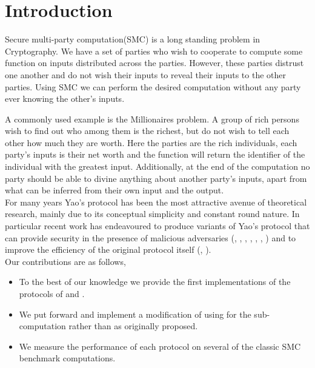 \documentclass[a4paper,11pt]{article}
\begin{document}
	
	\section{Introduction}
		Secure multi-party computation(SMC) is a long standing problem in Cryptography. We have a set of parties who wish to cooperate to compute some function on inputs distributed across the parties. However, these parties distrust one another and do not wish their inputs to reveal their inputs to the other parties. Using SMC we can perform the desired computation without any party ever knowing the other's inputs.

		A commonly used example is the Millionaires problem. A group of rich persons wish to find out who among them is the richest, but do not wish to tell each other how much they are worth. Here the parties are the rich individuals, each party's inputs is their net worth and the function will return the identifier of the individual with the greatest input. Additionally, at the end of the computation no party should be able to divine anything about another party's inputs, apart from what can be inferred from their own input and the output.\\

		For many years Yao's protocol \cite{YaoOriginal} has been the most attractive avenue of theoretical research, mainly due to its conceptual simplicity and constant round nature. In particular recent work has endeavoured to produce variants of Yao's protocol that can provide security in the presence of malicious adversaries (\cite{LindellAndPinkas2007}, \cite{LindellAndPinkas2011}, \cite{Lindell_CnC_2013}, \cite{Katz_Symm_CnC_2013}, \cite{OnCommittedInputs}, \cite{LEGO_Paper}, \cite{MiniLEGO}) and to improve the efficiency of the original protocol itself (\cite{SMC_Is_Practical}, \cite{FreeXOR}).\\



		Our contributions are as follows,

		\begin{itemize}
			\item To the best of our knowledge we provide the first implementations of the protocols of \cite{LindellAndPinkas2011} and \cite{Lindell_CnC_2013}.%
			\item We put forward and implement a modification of \cite{Lindell_CnC_2013} using \cite{Katz_Symm_CnC_2013} for the sub-computation rather than \cite{LindellAndPinkas2011} as originally proposed.
			\item We measure the performance of each protocol on several of the classic SMC benchmark computations.
		\end{itemize}
\end{document}

